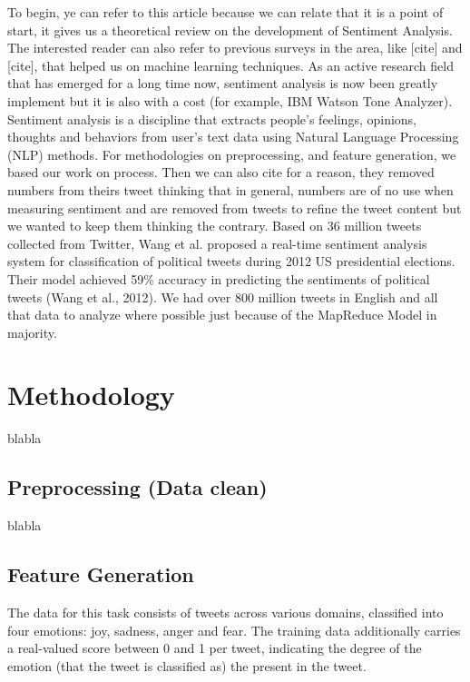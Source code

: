 \documentclass{acmtog} %
\begin{document}
To begin, ye can refer to this article \cite{Palpanas11} because we can relate that it is a point of start, it gives us a theoretical review on the development of Sentiment Analysis.
The interested reader can also refer to previous surveys in the area, like [cite] and [cite], that helped us on machine learning techniques. As an active research field that has emerged for a long time now, sentiment analysis is now been greatly implement but it is also with a cost (for example, IBM Watson Tone Analyzer). Sentiment analysis is a discipline that extracts people’s feelings, opinions, thoughts and behaviors from user’s text data using Natural Language Processing (NLP) methods. 
For methodologies on preprocessing, and feature generation, we based our work on \cite{Meisheri17} process. Then we can also cite \cite{Jianqiang17} for a reason, they removed numbers from theirs tweet thinking that in general, numbers are of no use when measuring sentiment and are removed from tweets to refine the tweet content but we wanted to keep them thinking the contrary.
Based on 36 million tweets collected from Twitter, Wang et al. proposed a real-time sentiment analysis system for classification of political tweets during 2012 US presidential elections. Their model achieved 59\% accuracy in predicting the sentiments of political tweets (Wang et al., 2012).
We had over 800 million tweets in English and all that data to analyze where possible just because of the MapReduce Model \cite{Baltas17} in majority.


\section{Methodology}
\label{sec:methodology}

blabla

\subsection{Preprocessing (Data clean)}
\label{subsub:preprocessing}

blabla

\subsection{Feature Generation}
\label{subsub:feature}

The data for this task consists of tweets across various domains, classified into four emotions: joy, sadness, anger and fear. The training data additionally carries a real-valued score between 0 and 1 per tweet, indicating the degree of the emotion (that the tweet is classified as) the present in the tweet.
\end{document}
